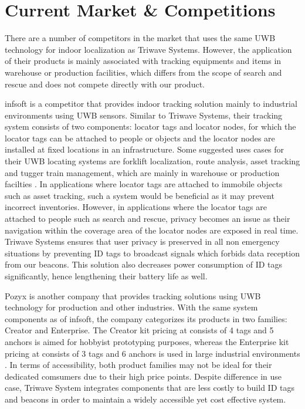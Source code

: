 

\setcounter{section}{2}
\section{Current Market \& Competitions}
\bigskip

There are a number of competitors in the market that uses the same UWB technology for indoor localization as Triwave Systems. However, the application of their products is mainly associated with tracking equipments and items in warehouse or production facilities, which differs from the scope of search and rescue and does not compete directly with our product. 

\bigskip
infsoft is a competitor that provides indoor tracking solution mainly to industrial environments using UWB sensors. Similar to Triwave Systems, their tracking system consists of two components: locator tags and locator nodes, for which the locator tags can be attached to people or objects and the locator nodes are installed at fixed locations in an infrastructure. Some suggested uses cases for their UWB locating systems are forklift localization, route analysis, asset tracking and tugger train management, which are mainly in warehouse or production facilties \cite{R3-1}. In applications where locator tags are attached to immobile objects such as asset tracking, such a system would be beneficial as it may prevent incorrect inventories. However, in applications where the locator tags are attached to people such as search and rescue, privacy becomes an issue as their navigation within the coverage area of the locator nodes are exposed in real time. Triwave Systems ensures that user privacy is preserved in all non emergency situations by preventing ID tags to broadcast signals which forbids data reception from our beacons. This solution also decreases power consumption of ID tags significantly, hence lengthening their battery life as well. 

\bigskip
Pozyx is another company that provides tracking solutions using UWB technology for production and other industries. With the same system components as of infsoft, the company categorizes its products in two families: Creator and Enterprise. The Creator kit pricing at  consists of 4 tags and 5 anchors is aimed for hobbyist prototyping purposes, whereas the Enterprise kit pricing at  consists of 3 tags and 6 anchors is used in large industrial environments \cite{R3-2}. In terms of accessibility, both product families may not be ideal for their dedicated comsumers due to their high price points. Despite difference in use case, Triwave System integrates components that are less costly to build ID tags and beacons in order to maintain a widely accessible yet cost effective system. 

